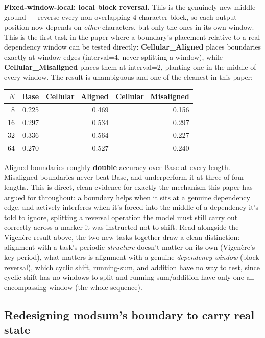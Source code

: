 \documentclass[11pt]{article}
\begin{document}
\textbf{Fixed-window-local: local block reversal.} This is the genuinely new middle ground --- reverse every non-overlapping 4-character block, so each output position now depends on \emph{other} characters, but only the ones in its own window. This is the first task in the paper where a boundary's placement relative to a real dependency window can be tested directly: \textbf{Cellular\_Aligned} places boundaries exactly at window edges (interval=4, never splitting a window), while \textbf{Cellular\_Misaligned} places them at interval=2, planting one in the middle of every window. The result is unambiguous and one of the cleanest in this paper:

\begin{table}[htbp]
\centering
\small
\begin{tabular}{rrrr}
\toprule
$N$ & Base & Cellular\_Aligned & Cellular\_Misaligned \\
\midrule
8  & 0.225 & 0.469 & 0.156 \\
16 & 0.297 & 0.534 & 0.297 \\
32 & 0.336 & 0.564 & 0.227 \\
64 & 0.270 & 0.527 & 0.240 \\
\bottomrule
\end{tabular}
\end{table}

Aligned boundaries roughly \textbf{double} accuracy over Base at every length. Misaligned boundaries never beat Base, and underperform it at three of four lengths. This is direct, clean evidence for exactly the mechanism this paper has argued for throughout: a boundary helps when it sits at a genuine dependency edge, and actively interferes when it's forced into the middle of a dependency it's told to ignore, splitting a reversal operation the model must still carry out correctly across a marker it was instructed not to shift. Read alongside the Vigenère result above, the two new tasks together draw a clean distinction: alignment with a task's periodic \emph{structure} doesn't matter on its own (Vigenère's key period), what matters is alignment with a genuine \emph{dependency window} (block reversal), which cyclic shift, running-sum, and addition have no way to test, since cyclic shift has no windows to split and running-sum/addition have only one all-encompassing window (the whole sequence).

\subsection{Redesigning modsum's boundary to carry real state}
\label{sec:modsum-state-carrying}
\end{document}
